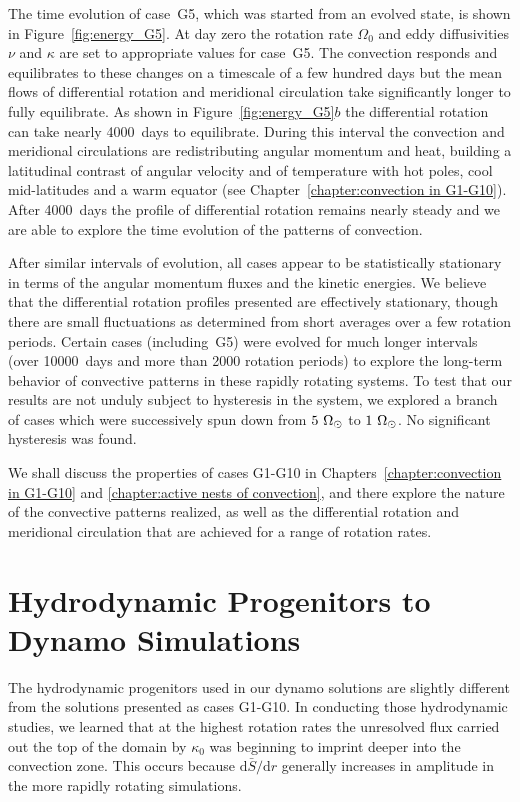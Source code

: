 The time evolution of case~G5, which was
started from an evolved state, is shown in
Figure~\ref{fig:energy_G5}.  At day zero the rotation rate $\Omega_0$
and eddy diffusivities $\nu$ and $\kappa$ are set to appropriate
values for case~G5.  The convection responds and equilibrates to these
changes on a timescale of a few
hundred days but the mean flows of differential rotation and
meridional circulation take significantly longer to fully
equilibrate.  As shown in Figure~\ref{fig:energy_G5}$b$ the
differential rotation can take nearly 4000~days to equilibrate.
During this interval the convection and meridional circulations are
redistributing angular momentum and heat, building a latitudinal
contrast of angular velocity and of temperature with hot poles, cool
mid-latitudes and a warm equator (see Chapter~\ref{chapter:convection in G1-G10}). 
After 4000~days the profile of differential rotation remains nearly steady
and we are able to explore the time evolution of the patterns of convection.


After similar intervals of evolution, all cases appear to be
statistically stationary in terms of the angular momentum fluxes and
the kinetic energies.  We believe that the differential rotation
profiles presented are effectively stationary, though there are small
fluctuations as determined from short averages over a few rotation
periods.  Certain cases (including~G5) were evolved for much longer
intervals (over 10000~days and more than 2000 rotation periods) to
explore the long-term behavior of convective patterns in these rapidly
rotating systems.  To test that our results are not unduly subject to
hysteresis in the system, we explored a branch of cases which were
successively spun down from $5~\Omega_\odot$ to $1~\Omega_\odot$.  No
significant hysteresis was found.

We shall discuss the properties of cases G1-G10 in 
Chapters~\ref{chapter:convection in G1-G10} and 
\ref{chapter:active nests of convection}, and there explore the nature
of the convective patterns realized, as well as the
differential rotation and meridional circulation that are achieved for
a range of rotation rates.

\section{Hydrodynamic Progenitors to Dynamo Simulations}

The hydrodynamic progenitors used in our dynamo solutions are slightly
different from the solutions presented as cases G1-G10.
In conducting those hydrodynamic studies, we
learned that at the highest rotation rates the unresolved flux carried
out the top of the domain by $\kappa_0$ was beginning to imprint
deeper into the convection zone.  This occurs because
$\mathrm{d}\bar{S}/\mathrm{d}r$ generally increases in amplitude in
the more rapidly rotating simulations. 

